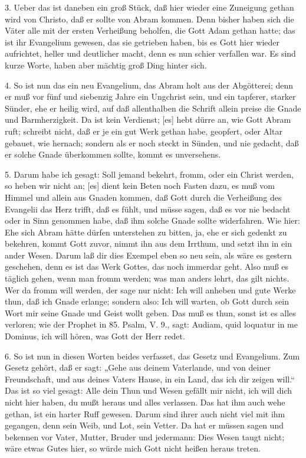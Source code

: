 3. Ueber das ist daneben ein groß Stück, daß hier wieder eine Zuneigung gethan wird von Christo, daß er sollte von Abram kommen. Denn bisher haben sich die Väter alle mit der ersten Verheißung beholfen, die Gott Adam gethan hatte; das ist ihr Evangelium gewesen, das sie getrieben haben, bis es Gott hier wieder aufrichtet, heller und deutlicher macht, denn es nun schier verfallen war. Es sind kurze Worte, haben aber mächtig groß Ding hinter sich.

4. So ist nun das ein neu Evangelium, das Abram holt aus der Abgötterei; denn er muß vor fünf und siebenzig Jahre ein Ungchrist sein, und ein tapferer, starker Sünder, ehe er heilig wird, auf daß allenthalben die Schrift allein preise die Gnade und Barmherzigkeit. Da ist kein Verdienst; [es] hebt dürre an, wie Gott Abram ruft; schreibt nicht, daß er je ein gut Werk gethan habe, geopfert, oder Altar gebauet, wie hernach; sondern als er noch steckt in Sünden, und nie gedacht, daß er solche Gnade überkommen sollte, kommt es unversehens.

5. Darum habe ich gesagt: Soll jemand bekehrt, fromm, oder ein Christ werden, so heben wir nicht an; [es] dient kein Beten noch Fasten dazu, es muß vom Himmel und allein aus Gnaden kommen, daß Gott durch die Verheißung des Evangelii das Herz trifft, daß es fühlt, und müsse sagen, daß es vor nie bedacht oder in Sinn genommen habe, daß ihm solche Gnade sollte widerfahren. Wie hier: Ehe sich Abram hätte dürfen unterstehen zu bitten, ja, ehe er sich gedenkt zu bekehren, kommt Gott zuvor, nimmt ihn aus dem Irrthum, und setzt ihn in ein ander Wesen. Darum laß dir dies Exempel eben so neu sein, als wäre es gestern geschehen, denn es ist das Werk Gottes, das noch immerdar geht. Also muß es täglich gehen, wenn man fromm werden; was man anders lehrt, das gilt nichts. Wer da fromm will werden, der sage nur nicht: Ich will anheben und gute Werke thun, daß ich Gnade erlange; sondern also: Ich will warten, ob Gott durch sein Wort mir seine Gnade und Geist wollt geben. Das muß es thun, sonst ist es alles verloren; wie der Prophet in 85. Psalm, V. 9., sagt: Audiam, quid loquatur in me Dominus, ich will hören, was Gott der Herr redet.

6. So ist nun in diesen Worten beides verfasset, das Gesetz und Evangelium. Zum Gesetz gehört, daß er sagt: „Gehe aus deinem Vaterlande, und von deiner Freundschaft, und aus deines Vaters Hause, in ein Land, das ich dir zeigen will.“ Das ist so viel gesagt: Alle dein Thun und Wesen gefällt mir nicht, ich will dich nicht hier haben, du mußt heraus und alles verlassen. Das hat ihm auch wehe gethan, ist ein harter Ruff gewesen. Darum sind ihrer auch nicht viel mit ihm gegangen, denn sein Weib, und Lot, sein Vetter. Da hat er müssen sagen und bekennen vor Vater, Mutter, Bruder und jedermann: Dies Wesen taugt nicht; wäre etwas Gutes hier, so würde mich Gott nicht heißen heraus treten.


